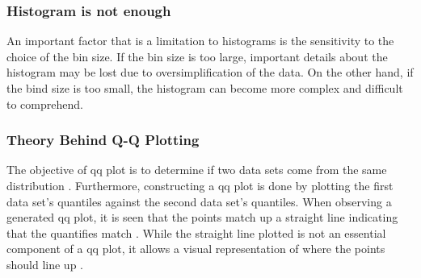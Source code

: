 \documentclass[final, hidelinks, 12pt, a4paper]{article}
\begin{document}
    \subsubsection{Histogram is not enough}
    \label{sssct:histoNotEnough}
    An important factor that is a limitation to histograms is the sensitivity to the choice of the bin size.
    If the bin size is too large, important details about the histogram may be lost due to oversimplification of the data.
    On the other hand, if the bind size is too small, the histogram can become more complex and difficult to comprehend.
    \subsubsection{Theory Behind Q-Q Plotting}
    \label{sssct:theoryQQ}
    The objective of \gls{qq} plot is to determine if two data sets come from the same distribution \cite{acc:qq}.
    Furthermore, constructing a \gls{qq} plot is done by plotting the first data set's quantiles against the second data set's quantiles.
    When observing a generated \gls{qq} plot, it is seen that the points match up a straight line indicating that the quantifies match \cite{acc:qq}.
    While the straight line plotted is not an essential component of a \gls{qq} plot, it allows a visual representation of where the points should line up \cite{acc:qq}.
\end{document}
